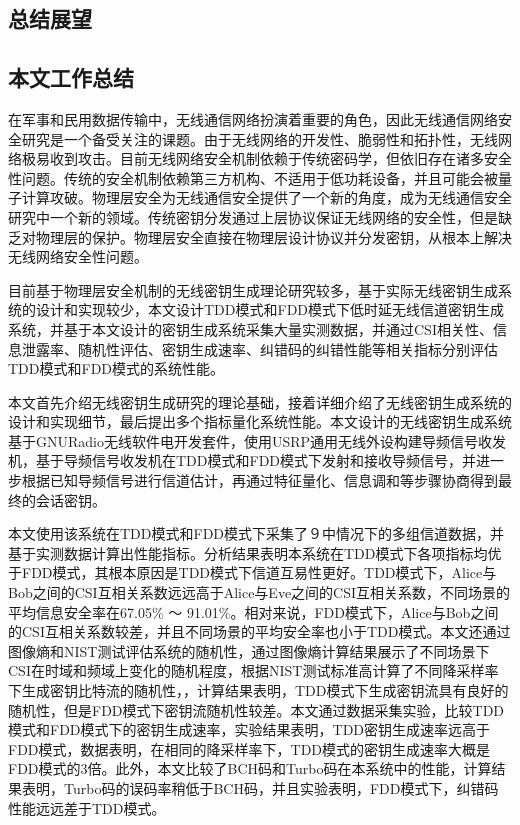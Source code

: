 \documentclass[master]{seuthesis} %
\begin{document}
\begin{Main}
\chapter{总结展望}

\section{本文工作总结}

在军事和民用数据传输中，无线通信网络扮演着重要的角色，因此无线通信网络安全研究是一个备受关注的课题。由于无线网络的开发性、脆弱性和拓扑性，无线网络极易收到攻击。目前无线网络安全机制依赖于传统密码学，但依旧存在诸多安全性问题。传统的安全机制依赖第三方机构、不适用于低功耗设备，并且可能会被量子计算攻破。物理层安全为无线通信安全提供了一个新的角度，成为无线通信安全研究中一个新的领域。传统密钥分发通过上层协议保证无线网络的安全性，但是缺乏对物理层的保护。物理层安全直接在物理层设计协议并分发密钥，从根本上解决无线网络安全性问题。

目前基于物理层安全机制的无线密钥生成理论研究较多，基于实际无线密钥生成系统的设计和实现较少，本文设计TDD模式和FDD模式下低时延无线信道密钥生成系统，并基于本文设计的密钥生成系统采集大量实测数据，并通过CSI相关性、信息泄露率、随机性评估、密钥生成速率、纠错码的纠错性能等相关指标分别评估TDD模式和FDD模式的系统性能。

本文首先介绍无线密钥生成研究的理论基础，接着详细介绍了无线密钥生成系统的设计和实现细节，最后提出多个指标量化系统性能。本文设计的无线密钥生成系统基于GNURadio无线软件电开发套件，使用USRP通用无线外设构建导频信号收发机，基于导频信号收发机在TDD模式和FDD模式下发射和接收导频信号，并进一步根据已知导频信号进行信道估计，再通过特征量化、信息调和等步骤协商得到最终的会话密钥。

本文使用该系统在TDD模式和FDD模式下采集了９中情况下的多组信道数据，并基于实测数据计算出性能指标。分析结果表明本系统在TDD模式下各项指标均优于FDD模式，其根本原因是TDD模式下信道互易性更好。TDD模式下，Alice与Bob之间的CSI互相关系数远远高于Alice与Eve之间的CSI互相关系数，不同场景的平均信息安全率在67.05\% ～ 91.01\%。相对来说，FDD模式下，Alice与Bob之间的CSI互相关系数较差，并且不同场景的平均安全率也小于TDD模式。本文还通过图像熵和NIST测试评估系统的随机性，通过图像熵计算结果展示了不同场景下CSI在时域和频域上变化的随机程度，根据NIST测试标准高计算了不同降采样率下生成密钥比特流的随机性，，计算结果表明，TDD模式下生成密钥流具有良好的随机性，但是FDD模式下密钥流随机性较差。本文通过数据采集实验，比较TDD模式和FDD模式下的密钥生成速率，实验结果表明，TDD密钥生成速率远高于FDD模式，数据表明，在相同的降采样率下，TDD模式的密钥生成速率大概是FDD模式的3倍。此外，本文比较了BCH码和Turbo码在本系统中的性能，计算结果表明，Turbo码的误码率稍低于BCH码，并且实验表明，FDD模式下，纠错码性能远远差于TDD模式。


\end{Main}
\end{document}
